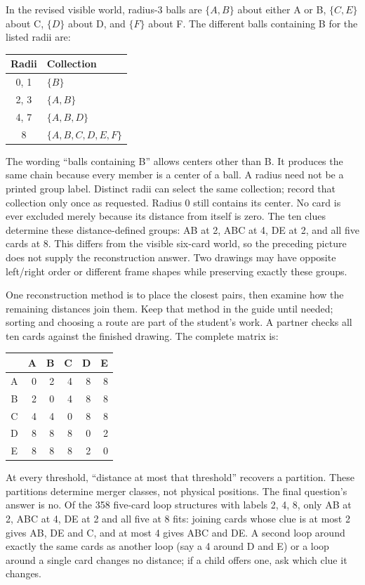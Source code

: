 In the revised visible world, radius-3 balls are $\{A,B\}$ about either A or B, $\{C,E\}$ about C, $\{D\}$ about D, and $\{F\}$ about F. The different balls containing B for the listed radii are:
\begin{center}\renewcommand{\arraystretch}{1.25}
\begin{tabular}{c l}
Radii & Collection\\\midrule
0, 1 & $\{B\}$\\
2, 3 & $\{A,B\}$\\
4, 7 & $\{A,B,D\}$\\
8 & $\{A,B,C,D,E,F\}$
\end{tabular}\end{center}
The wording ``balls containing B'' allows centers other than B. It produces the same chain because every member is a center of a ball. A radius need not be a printed group label. Distinct radii can select the same collection; record that collection only once as requested. Radius 0 still contains its center. No card is ever excluded merely because its distance from itself is zero.
\newpage
{}
The ten clues determine these distance-defined groups: AB at 2, ABC at 4, DE at 2, and all five cards at 8. This differs from the visible six-card world, so the preceding picture does not supply the reconstruction answer. Two drawings may have opposite left/right order or different frame shapes while preserving exactly these groups.

One reconstruction method is to place the closest pairs, then examine how the remaining distances join them. Keep that method in the guide until needed; sorting and choosing a route are part of the student's work. A partner checks all ten cards against the finished drawing. The complete matrix is:
\begin{center}\renewcommand{\arraystretch}{1.2}
\begin{tabular}{c|rrrrr}
&A&B&C&D&E\\\hline
A&0&2&4&8&8\\
B&2&0&4&8&8\\
C&4&4&0&8&8\\
D&8&8&8&0&2\\
E&8&8&8&2&0
\end{tabular}\end{center}
At every threshold, ``distance at most that threshold'' recovers a partition. These partitions determine merger classes, not physical positions. The final question's answer is no. Of the 358 five-card loop structures with labels 2, 4, 8, only AB at 2, ABC at 4, DE at 2 and all five at 8 fits: joining cards whose clue is at most 2 gives AB, DE and C, and at most 4 gives ABC and DE. A second loop around exactly the same cards as another loop (say a 4 around D and E) or a loop around a single card changes no distance; if a child offers one, ask which clue it changes.

